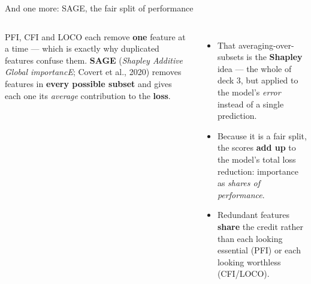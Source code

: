 \documentclass[aspectratio=169]{beamer}
\begin{document}
\begin{frame}{And one more: SAGE, the fair split of performance}
  \begin{columns}[T]
    PFI, CFI and LOCO each remove \textbf{one} feature at a time --- which is exactly why
    duplicated features confuse them. \textbf{SAGE} (\emph{Shapley Additive Global importancE};
    Covert et al., 2020) removes features in \textbf{every possible subset} and gives each one its
    \emph{average} contribution to the \textbf{loss}.
    \vskip 4pt
    \begin{itemize}\small
      \item That averaging-over-subsets is the \textbf{Shapley} idea --- the whole of deck 3, but
        applied to the model's \emph{error} instead of a single prediction.
      \item Because it is a fair split, the scores \textbf{add up} to the model's total loss
        reduction: importance as \emph{shares of performance}.
      \item Redundant features \textbf{share} the credit rather than each looking essential
        (PFI) or each looking worthless (CFI/LOCO).
    \end{itemize}
    \vskip 8pt
  \end{columns}
\end{frame}
\end{document}
